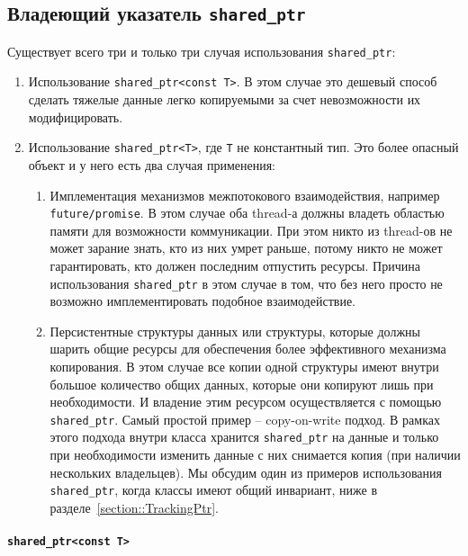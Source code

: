 \subsection{Владеющий указатель \texttt{shared\_ptr}}
\label{section::SharedPtr}

Существует всего три и только три случая использования \texttt{shared\_ptr}:
\begin{enumerate}
\item Использование \texttt{shared\_ptr<const T>}.
В этом случае это дешевый способ сделать тяжелые данные легко копируемыми за счет невозможности их модифицировать.

\item Использование \texttt{shared\_ptr<T>}, где \texttt{T} не константный тип.
Это более опасный объект и у него есть два случая применения:
\begin{enumerate}
\item Имплементация механизмов межпотокового взаимодействия, например \texttt{future/promise}.
В этом случае оба thread-а должны владеть областью памяти для возможности коммуникации.
При этом никто из thread-ов не может зарание знать, кто из них умрет раньше, потому никто не может гарантировать, кто должен последним отпустить ресурсы.
Причина использования \texttt{shared\_ptr} в этом случае в том, что без него просто не возможно имплементировать подобное взаимодействие.

\item Персистентные структуры данных или структуры, которые должны шарить общие ресурсы для обеспечения более эффективного механизма копирования.
В этом случае все копии одной структуры имеют внутри большое количество общих данных, которые они копируют лишь при необходимости.
И владение этим ресурсом осуществляется с помощью \texttt{shared\_ptr}.
Самый простой пример -- copy-on-write подход.
В рамках этого подхода внутри класса хранится \texttt{shared\_ptr} на данные и только при необходимости изменить данные с них снимается копия (при наличии нескольких владельцев).
Мы обсудим один из примеров использования \texttt{shared\_ptr}, когда классы имеют общий инвариант, ниже в разделе~\ref{section::TrackingPtr}.
\end{enumerate}
\end{enumerate}

\paragraph{\texttt{shared\_ptr<const T>}}

